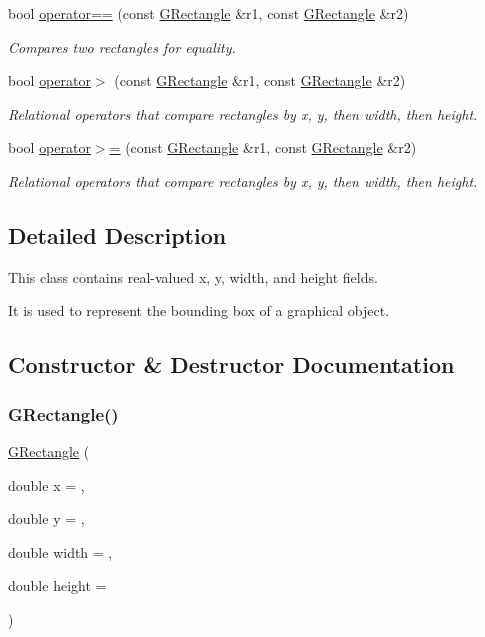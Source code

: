 \begin{DoxyCompactItemize}
bool \mbox{\hyperlink{classGRectangle_a83a32754b7097b7c484607635114ce5e}{operator==}} (const \mbox{\hyperlink{classGRectangle}{G\+Rectangle}} \&r1, const \mbox{\hyperlink{classGRectangle}{G\+Rectangle}} \&r2)
\begin{DoxyCompactList}\small\item\em Compares two rectangles for equality. \end{DoxyCompactList}\item 
bool \mbox{\hyperlink{classGRectangle_a99b0e23f34dced98f43fd0250c9cdf40}{operator$>$}} (const \mbox{\hyperlink{classGRectangle}{G\+Rectangle}} \&r1, const \mbox{\hyperlink{classGRectangle}{G\+Rectangle}} \&r2)
\begin{DoxyCompactList}\small\item\em Relational operators that compare rectangles by x, y, then width, then height. \end{DoxyCompactList}\item 
bool \mbox{\hyperlink{classGRectangle_a206b248cb2a1fdece41beb61e5d41904}{operator$>$=}} (const \mbox{\hyperlink{classGRectangle}{G\+Rectangle}} \&r1, const \mbox{\hyperlink{classGRectangle}{G\+Rectangle}} \&r2)
\begin{DoxyCompactList}\small\item\em Relational operators that compare rectangles by x, y, then width, then height. \end{DoxyCompactList}\end{DoxyCompactItemize}


\subsection{Detailed Description}
This class contains real-\/valued x, y, width, and height fields. 

It is used to represent the bounding box of a graphical object. 

\subsection{Constructor \& Destructor Documentation}
\mbox{\label{classGRectangle_a3e31a47f01a0e643b572a11b46ce9f69}} 
\subsubsection{\texorpdfstring{G\+Rectangle()}{GRectangle()}\hspace{0.1cm}{\footnotesize\ttfamily [1/4]}}
{\footnotesize\ttfamily \mbox{\hyperlink{classGRectangle}{G\+Rectangle}} (\begin{DoxyParamCaption}\item[{double}]{x = {},  }\item[{double}]{y = {},  }\item[{double}]{width = {},  }\item[{double}]{height = {} }\end{DoxyParamCaption})}




